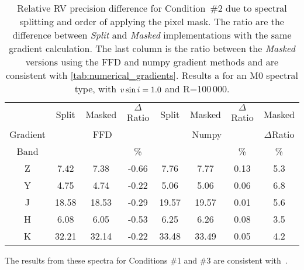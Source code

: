 
\begin{table}
    \centering
    \caption[{RV} precision with different splitting.]{Relative {RV} precision difference for Condition~\#2 due to spectral splitting and order of applying the pixel mask.
        The ratio are the difference between \textit{Split} and \textit{Masked} implementations with the same gradient calculation.
        The last column is the ratio between the \textit{Masked} versions using the {FFD} and numpy gradient methods and are consistent with \cref{tab:numerical_gradients}.
        Results a for an M0 spectral type, with $v\sin{i}=1.0$ and R=100\,000.}
    \begin{tabular}{c|ccc|ccc|c}
        \toprule
        & Split & Masked & \(\Delta\)Ratio & Split & Masked & \(\Delta\)Ratio & Masked \\
        Gradient & \multicolumn{3}{c|}{FFD} & \multicolumn{3}{c|}{Numpy} & \(\Delta\)Ratio\\
        Band & \mps{} & \mps{} &  \%  & \mps{} & \mps{} &   \% & \% \\
        \midrule
        Z &  7.42 &  7.38 & -0.66 &  7.76 &  7.77 & 0.13 & 5.3\\
        Y &  4.75 &  4.74 & -0.22 &  5.06 &  5.06 & 0.06 & 6.8\\
        J & 18.58 & 18.53 & -0.29 & 19.57 & 19.57 & 0.01 & 5.6\\
        H &  6.08 &  6.05 & -0.53 &  6.25 &  6.26 & 0.08 & 3.5\\
        K & 32.21 & 32.14 & -0.22 & 33.48 & 33.49 & 0.05 & 4.2\\
        \bottomrule
    \end{tabular}\label{tab:mask_ordering}
\end{table}

{\rd{} The results from these spectra for Conditions \#1 and \#3 are consistent with~\citet{figueira_radial_2016}.
     }
